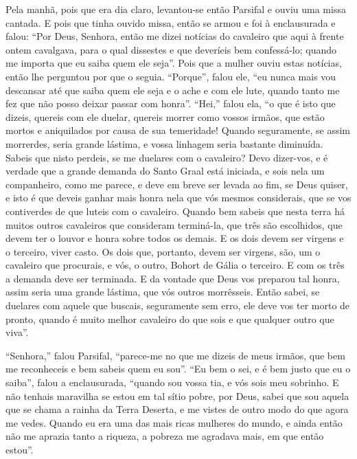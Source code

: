 Pela manhã, pois que era dia claro, levantou-se então Parsifal e ouviu uma
missa cantada. E pois que tinha ouvido missa, então se armou e foi à
enclausurada e falou: “Por Deus, Senhora, então me dizei notícias do cavaleiro
que aqui à frente ontem cavalgava, para o qual dissestes  e que deveríeis bem
confessá-lo; quando me importa que eu saiba quem ele seja”. Pois que a mulher
ouviu estas notícias, então lhe perguntou por que o seguia. “Porque”, falou
ele, “eu nunca mais vou descansar até que saiba quem ele seja e o ache e com ele
lute, quando tanto me fez que não posso deixar passar com honra”. “Hei,” falou
ela, “o que é isto que dizeis, quereis com ele duelar, quereis morrer como
vossos irmãos, que estão mortos e aniquilados por causa de sua temeridade!
Quando seguramente, se assim morrerdes, seria grande lástima, e vossa linhagem
seria bastante diminuída. Sabeis  que nisto perdeis, se me duelares
com o cavaleiro? Devo dizer-vos,  e é verdade que a grande demanda do Santo
Graal está iniciada, e sois nela um companheiro, como me parece, e deve em
breve ser levada ao fim, se Deus quiser, e isto é que deveis ganhar mais honra
nela que vós mesmos considerais, que se vos contiverdes de que luteis com o
cavaleiro. Quando bem sabeis que nesta terra há muitos outros cavaleiros que
consideram terminá-la, que três são escolhidos, que devem ter o louvor e honra
sobre todos os demais. E os dois devem ser virgens e o terceiro, viver casto. Os
dois que, portanto, devem ser virgens, são, um o cavaleiro que procurais, e
vós, o outro, Bohort de Gália o terceiro. E com os três a demanda deve ser
terminada. E da vontade que Deus vos preparou tal honra, assim seria uma grande
lástima, que vós outros morrêsseis. Então sabei, se duelares com aquele que
buscais, seguramente sem erro, ele deve vos ter morto de pronto, quando é muito
melhor cavaleiro do que sois e que qualquer outro que viva”. 

“Senhora,” falou Parsifal, “parece-me no que me dizeis de meus irmãos, que
bem me reconheceis e bem sabeis quem eu sou”. “Eu bem o sei, e é bem justo que
eu o saiba”, falou a enclausurada, “quando sou vossa tia, e vós sois meu
sobrinho. E não tenhais maravilha se estou em tal sítio pobre, por Deus, sabei
que sou aquela que se chama a rainha da Terra Deserta, e me vistes de outro
modo do que agora me vedes. Quando eu era uma das mais ricas mulheres do mundo,
e ainda então não me aprazia tanto a riqueza, a pobreza me agradava mais, em
que então estou”. 

